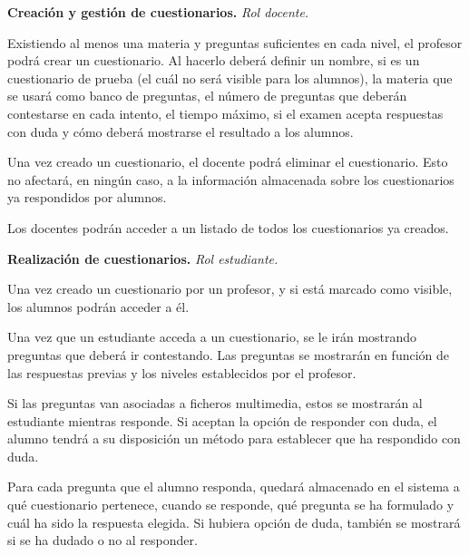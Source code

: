 \begin{rf0}
	\item \textbf{Creación y gestión de cuestionarios.} \textit{Rol docente.}
		\begin{rf0*}
			\item Existiendo al menos una materia y preguntas suficientes en cada nivel, el profesor podrá crear un cuestionario. Al hacerlo deberá definir un nombre, si es un cuestionario de prueba (el cuál no será visible para los alumnos), la materia que se usará como banco de preguntas, el número de preguntas que deberán contestarse en cada intento, el tiempo máximo, si el examen acepta respuestas con duda y cómo deberá mostrarse el resultado a los alumnos.
			\item Una vez creado un cuestionario, el docente podrá eliminar el cuestionario. Esto no afectará, en ningún caso, a la información almacenada sobre los cuestionarios ya respondidos por alumnos.
			\item Los docentes podrán acceder a un listado de todos los cuestionarios ya creados.
		\end{rf0*}
		
	\item \textbf{Realización de cuestionarios.} \textit{Rol estudiante.}
		\begin{rf0*}
			\item Una vez creado un cuestionario por un profesor, y si está marcado como visible, los alumnos podrán acceder a él.
			\item Una vez que un estudiante acceda a un cuestionario, se le irán mostrando preguntas que deberá ir contestando. Las preguntas se mostrarán en función de las respuestas previas y los niveles establecidos por el profesor.
			\item Si las preguntas van asociadas a ficheros multimedia, estos se mostrarán al estudiante mientras responde. Si aceptan la opción de responder con duda, el alumno tendrá a su disposición un método para establecer que ha respondido con duda.
			\item Para cada pregunta que el alumno responda, quedará almacenado en el sistema a qué cuestionario pertenece, cuando se responde, qué pregunta se ha formulado y cuál ha sido la respuesta elegida. Si hubiera opción de duda, también se mostrará si se ha dudado o no al responder.
		\end{rf0*}
	

\end{rf0}
